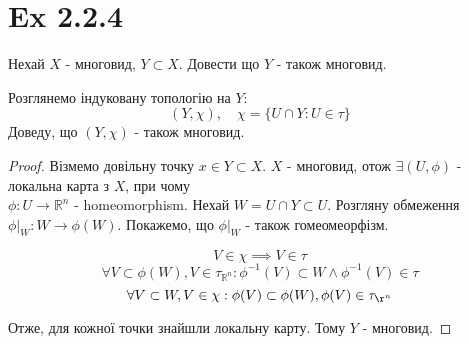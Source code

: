 \documentclass[10pt, a4paper]{article} %
\newcommand{\R}{\mathbb{R}}
\begin{document}
\section*{Ex 2.2.4}
\begin{mdframed}
    Нехай $X$ - многовид, $Y \subset X$.
    Довести що $Y$ - також многовид.
\end{mdframed}

Розглянемо індуковану топологію на $Y$:
\[(Y,\chi), \quad \chi = \{U\cap Y : U \in \tau\}\]
Доведу, що $(Y,\chi)$ - також многовид.

\begin{proof}
    Візмемо довільну точку $x\in Y\subset X$.
    $X$ - многовид, отож $\exists (U,\phi)$ - локальна карта з $X$, при чому\\
    $\phi: U \to \R^n$ - homeomorphism.
    Нехай $W = U\cap Y \subset U$. Розгляну обмеження $\phi|_W : W \to \phi(W)$. 
    Покажемо, що $\phi|_W$ - також гомеомеорфізм.
    
    \[V \in \chi \implies V \in \tau\]
    \[\forall V \subset \phi(W), V \in \tau_{\R^n}: \phi^{-1}(V) \subset W \land \phi^{-1}(V) \in \tau\]
    \[\forall V \subset W, V \in \chi: \phi(V) \subset \phi(W), \phi(V) \in \tau_{\r^n}\]

    Отже, для кожної точки знайшли локальну карту. Тому $Y$ - многовид.
\end{proof}


    
\end{document}
